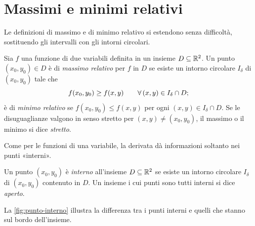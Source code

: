 \section{Massimi e minimi relativi}
\label{sec:estremi-due}

Le definizioni di massimo e di minimo relativo si estendono senza difficoltà,
sostituendo gli intervalli con gli intorni circolari.

\begin{definizione}\label{def:estremi-due}
Sia $f$ una funzione di due variabili definita in un insieme $D\subseteq\mathbb{R}^{2}$. Un punto
$(x_{0},y_{0})\in D$ è di \emph{massimo relativo} per $f$ in $D$ se esiste un intorno
circolare $I_{\delta}$ di $(x_{0},y_{0})$ tale che
\begin{equation}\label{eq:max-due}
  f(x_{0},y_{0})\ge f(x,y) \qquad\forall\,(x,y)\in I_{\delta}\cap D ;
\end{equation}
è di \emph{minimo relativo} se $f(x_{0},y_{0})\le f(x,y)$ per ogni
$(x,y)\in I_{\delta}\cap D$. Se le disuguaglianze valgono in senso stretto per
$(x,y)\neq(x_{0},y_{0})$, il massimo o il minimo si dice \emph{stretto}.
\end{definizione}

Come per le funzioni di una variabile, la derivata dà informazioni soltanto nei punti
«interni».

\begin{definizione}\label{def:punto-interno}
Un punto $(x_{0},y_{0})$ è \emph{interno} all'insieme $D\subseteq\mathbb{R}^{2}$ se esiste un
intorno circolare $I_{\delta}$ di $(x_{0},y_{0})$ contenuto in $D$. Un insieme i cui punti
sono tutti interni si dice \emph{aperto}.
\end{definizione}

La \cref{fig:punto-interno} illustra la differenza tra i punti interni e quelli che
stanno sul bordo dell'insieme.

